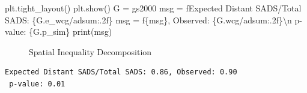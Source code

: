 \documentclass[
  a4paper, 
  twoside,
  final
]{article}
\newenvironment{Shaded}{\begin{snugshade}}{\end{snugshade}}
\newcommand{\BuiltInTok}[1]{\textcolor[rgb]{0.00,0.23,0.31}{#1}}
\newcommand{\CharTok}[1]{\textcolor[rgb]{0.13,0.47,0.30}{#1}}
\newcommand{\NormalTok}[1]{\textcolor[rgb]{0.00,0.23,0.31}{#1}}
\newcommand{\OperatorTok}[1]{\textcolor[rgb]{0.37,0.37,0.37}{#1}}
\newcommand{\SpecialCharTok}[1]{\textcolor[rgb]{0.37,0.37,0.37}{#1}}
\newcommand{\SpecialStringTok}[1]{\textcolor[rgb]{0.13,0.47,0.30}{#1}}
\begin{document}
\begin{Shaded}
\begin{Highlighting}[]
\NormalTok{plt.tight\_layout()}
\NormalTok{plt.show()}
\NormalTok{G }\OperatorTok{=}\NormalTok{ gs2000}
\NormalTok{msg }\OperatorTok{=} \SpecialStringTok{f\textquotesingle{}Expected Distant SADS/Total SADS: }\SpecialCharTok{\{}\NormalTok{G}\SpecialCharTok{.}\NormalTok{e\_wcg}\OperatorTok{/}\NormalTok{adsum}\SpecialCharTok{:.2f\}}\SpecialStringTok{\textquotesingle{}}
\NormalTok{msg }\OperatorTok{=} \SpecialStringTok{f\textquotesingle{}}\SpecialCharTok{\{}\NormalTok{msg}\SpecialCharTok{\}}\SpecialStringTok{, Observed: }\SpecialCharTok{\{}\NormalTok{G}\SpecialCharTok{.}\NormalTok{wcg}\OperatorTok{/}\NormalTok{adsum}\SpecialCharTok{:.2f\}}\CharTok{\textbackslash{}n}\SpecialStringTok{ p{-}value: }\SpecialCharTok{\{}\NormalTok{G}\SpecialCharTok{.}\NormalTok{p\_sim}\SpecialCharTok{\}}\SpecialStringTok{\textquotesingle{}}
\BuiltInTok{print}\NormalTok{(msg)}
\end{Highlighting}
\end{Shaded}

\begin{figure}[H]


\caption{\label{fig-gini-spatial}Spatial Inequality Decomposition}

\end{figure}%

\begin{verbatim}
Expected Distant SADS/Total SADS: 0.86, Observed: 0.90
 p-value: 0.01
\end{verbatim}
\end{document}
